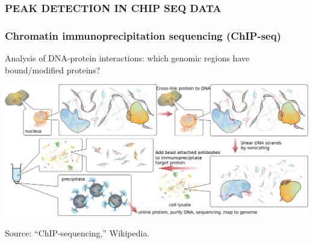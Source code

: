 \documentclass{beamer}
\begin{document}
\begin{frame}
  \frametitle{PEAK DETECTION IN CHIP SEQ DATA}
  
\end{frame}

\begin{frame}
  \frametitle{Chromatin immunoprecipitation sequencing (ChIP-seq)}
  Analysis of DNA-protein interactions: which genomic regions have
  bound/modified proteins?

  \includegraphics[width=\textwidth]{Chromatin_immunoprecipitation_sequencing_wide.png}

  Source: ``ChIP-sequencing,'' Wikipedia.
\end{frame}



\end{document}
